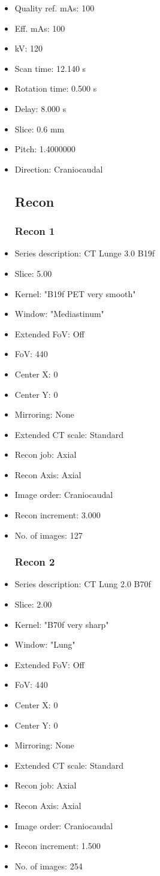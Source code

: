 \documentclass[12pt]{article}
\begin{document}
\begin{itemize}
\subsection{Scan}
\item Quality ref. mAs: 100\item Eff. mAs: 100\item kV: 120\item Scan time: 12.140 s\item Rotation time: 0.500 s\item Delay: 8.000 s\item Slice: 0.6 mm\item Pitch: 1.4000000\item Direction: Craniocaudal
\subsection{Recon}

\subsubsection{Recon 1}
\item Series description: CT Lunge 3.0 B19f
\item Slice: 5.00
\item Kernel: "B19f PET very smooth"
\item Window: "Mediastinum"
\item Extended FoV: Off
\item FoV: 440
\item Center X: 0
\item Center Y: 0
\item Mirroring: None
\item Extended CT scale: Standard
\item Recon job: Axial
\item Recon Axis: Axial
\item Image order: Craniocaudal
\item Recon increment: 3.000
\item No. of images: 127
\subsubsection{Recon 2}
\item Series description: CT Lung 2.0 B70f
\item Slice: 2.00
\item Kernel: "B70f very sharp"
\item Window: "Lung"
\item Extended FoV: Off
\item FoV: 440
\item Center X: 0
\item Center Y: 0
\item Mirroring: None
\item Extended CT scale: Standard
\item Recon job: Axial
\item Recon Axis: Axial
\item Image order: Craniocaudal
\item Recon increment: 1.500
\item No. of images: 254

\end{itemize}
\end{document}
